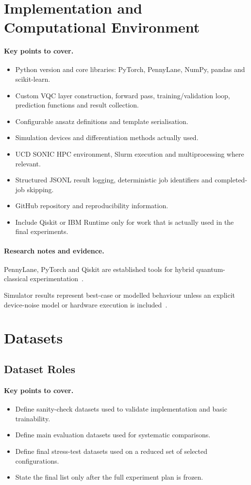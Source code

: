 \documentclass[]{UCD_CS_MSc_AAI_Report}
\newcommand{\limitation}[1]{{\color{orange}#1}}
\newcommand{\tooling}[1]{{\color{brown}#1}}
\newcommand{\sectionbrief}{\paragraph{Key points to cover.}}
\newcommand{\researchnotes}{\paragraph{Research notes and evidence.}}
\begin{document}
\section{Implementation and Computational Environment}
\label{sec:method-environment}

\sectionbrief
\begin{itemize}
    \item Python version and core libraries: PyTorch, PennyLane, NumPy, pandas and scikit-learn.
    \item Custom VQC layer construction, forward pass, training/validation loop, prediction functions and result collection.
    \item Configurable ansatz definitions and template serialisation.
    \item Simulation devices and differentiation methods actually used.
    \item UCD SONIC HPC environment, Slurm execution and multiprocessing where relevant.
    \item Structured JSONL result logging, deterministic job identifiers and completed-job skipping.
    \item GitHub repository and reproducibility information.
    \item Include Qiskit or IBM Runtime only for work that is actually used in the final experiments.
\end{itemize}

\researchnotes
\begin{itemize}
    \tooling{\item PennyLane, PyTorch and Qiskit are established tools for hybrid quantum-classical experimentation~\cite{du_quantum_2025,resch_quantum_2019}.}
    \limitation{\item Simulator results represent best-case or modelled behaviour unless an explicit device-noise model or hardware execution is included~\cite{tolotti_ensembles_2024}.}
\end{itemize}

\section{Datasets}
\label{sec:method-datasets}

\subsection{Dataset Roles}

\sectionbrief
\begin{itemize}
    \item Define sanity-check datasets used to validate implementation and basic trainability.
    \item Define main evaluation datasets used for systematic comparisons.
    \item Define final stress-test datasets used on a reduced set of selected configurations.
    \item State the final list only after the full experiment plan is frozen.
\end{itemize}
\end{document}
